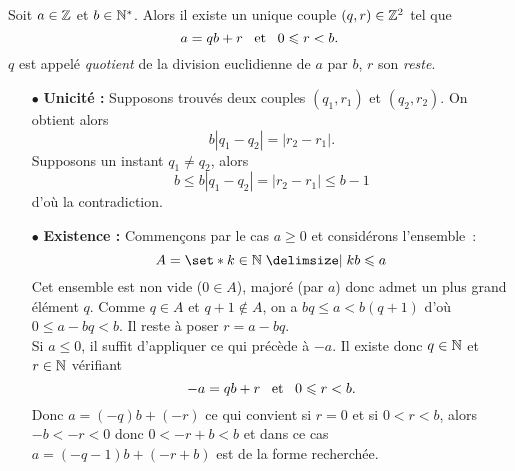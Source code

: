 \documentclass{magnolia}
\begin{document}
\begin{proposition}
Soit $a\in\mathbb{Z}$ et $b\in{\mathbb{N}^*}$. Alors il existe un unique couple $\left(q,r\right)\in\mathbb{Z}^2$
tel que
\[a=qb+r \quad\!\text{et}\quad\! 0\leqslant r<b.\]
$q$ est appelé \emph{quotient} de la division euclidienne de $a$ par $b$, $r$ son
\emph{reste}.
\end{proposition}

\begin{preuve}
\begin{itemize}
\item[$\bullet$] \textbf{Unicité :} Supposons trouvés deux couples $(q_1,r_1)$ et $(q_2,r_2)$. On obtient alors $$b|q_1-q_2|=|r_2-r_1|.$$ Supposons un instant $q_1\neq q_2$, alors $$b\leq b|q_1-q_2|=|r_2-r_1|\leq b-1$$ d'où la contradiction.
\item[$\bullet$] \textbf{Existence :} Commençons par le cas $a\geq 0$ et considérons l'ensemble~:
\[A=\enstq{k\in\N}{kb\leq a}\]
Cet ensemble est non vide ($0\in A$), majoré (par $a$) donc admet un plus grand
élément $q$. Comme $q\in A$ et $q+1 \notin A$, on a $bq\leq a <b(q+1)$ d'où $0\leq a-bq<b$. Il reste à poser $r=a-bq$.\\
Si $a\leq 0$, il suffit d'appliquer ce qui précède à $-a$. Il existe donc $q\in \mathbb{N}$ et $r\in \mathbb{N}$ vérifiant \[-a=qb+r \quad\!\text{et}\quad\! 0\leqslant r<b.\]
Donc $a=(-q)b+(-r)$ ce qui convient si $r=0$ et si $0<r<b$, alors $-b<-r<0$ donc $0<-r+b<b$ et dans ce cas $a=(-q-1)b+(-r+b)$ est de la forme recherchée.
\end{itemize}

\end{preuve}
\end{document}
